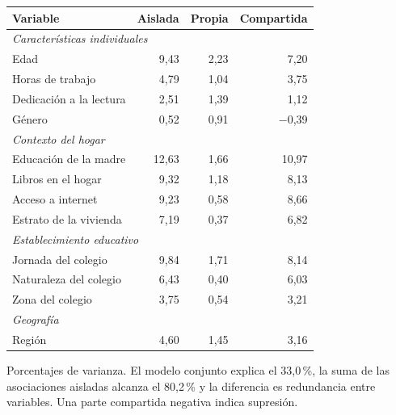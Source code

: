 \begingroup\tiny{}
\par
\noindent\begin{minipage}{\textwidth}
\centering
{}\label{tab:aportes}
\begin{tabular}{l r r r}
  \toprule
  \textbf{Variable} & \textbf{Aislada} & \textbf{Propia} & \textbf{Compartida} \\
  \midrule

  \multicolumn{4}{l}{\textit{Características individuales}} \\
  Edad & 9,43 & 2,23 & 7,20 \\
  Horas de trabajo & 4,79 & 1,04 & 3,75 \\
  Dedicación a la lectura & 2,51 & 1,39 & 1,12 \\
  Género & 0,52 & 0,91 & $-$0,39 \\
  \multicolumn{4}{l}{\textit{Contexto del hogar}} \\
  Educación de la madre & 12,63 & 1,66 & 10,97 \\
  Libros en el hogar & 9,32 & 1,18 & 8,13 \\
  Acceso a internet & 9,23 & 0,58 & 8,66 \\
  Estrato de la vivienda & 7,19 & 0,37 & 6,82 \\
  \multicolumn{4}{l}{\textit{Establecimiento educativo}} \\
  Jornada del colegio & 9,84 & 1,71 & 8,14 \\
  Naturaleza del colegio & 6,43 & 0,40 & 6,03 \\
  Zona del colegio & 3,75 & 0,54 & 3,21 \\
  \multicolumn{4}{l}{\textit{Geografía}} \\
  Región & 4,60 & 1,45 & 3,16 \\
  \bottomrule
\end{tabular}
\par\raggedright{\footnotesize Porcentajes de varianza. El modelo conjunto explica el 33,0\,\%, la suma de las asociaciones aisladas alcanza el 80,2\,\% y la diferencia es redundancia entre variables. Una parte compartida negativa indica supresión.\par}
\end{minipage}
\par
\endgroup
